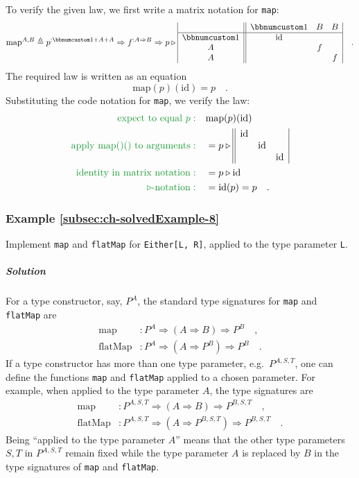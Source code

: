 To verify the given law, we first write a matrix notation for \lstinline!map!:
\[
\text{map}^{A,B}\triangleq p^{:\bbnum 1+A+A}\Rightarrow f^{:A\Rightarrow B}\Rightarrow p\triangleright\begin{array}{|c||ccc|}
 & \bbnum 1 & B & B\\
\hline \bbnum 1 & \text{id} &  & \\
A &  & f & \\
A &  &  & f
\end{array}\quad.
\]
The required law is written as an equation
\[
\text{map}(p)(\text{id})=p\quad.
\]
Substituting the code notation for \lstinline!map!, we verify the
law:
\begin{align*}
{\color{greenunder}\text{expect to equal }p:}\quad & \text{map}(p)(\text{id})\\
{\color{greenunder}\text{apply map()() to arguments}:}\quad & =p\triangleright\begin{array}{||ccc|}
\text{id} &  & \\
 & \text{id} & \\
 &  & \text{id}
\end{array}\\
{\color{greenunder}\text{identity in matrix notation}:}\quad & =p\triangleright\text{id}\\
{\color{greenunder}\triangleright\text{-notation}:}\quad & =\text{id}(p)=p\quad.
\end{align*}


\subsubsection{Example \label{subsec:ch-solvedExample-8}\ref{subsec:ch-solvedExample-8}}

Implement \lstinline!map! and \lstinline!flatMap! for \lstinline!Either[L, R]!,
applied to the type parameter \lstinline!L!.

\subparagraph{Solution}

For a type constructor, say, $P^{A}$, the standard type signatures
for \lstinline!map! and \lstinline!flatMap! are
\begin{align*}
\text{map} & :P^{A}\Rightarrow(A\Rightarrow B)\Rightarrow P^{B}\quad,\\
\text{flatMap} & :P^{A}\Rightarrow(A\Rightarrow P^{B})\Rightarrow P^{B}\quad.
\end{align*}
If a type constructor has more than one type parameter, e.g.~$P^{A,S,T}$,
one can define the functions \lstinline!map! and \lstinline!flatMap!
applied to a chosen parameter. For example, when applied to the type
parameter $A$, the type signatures are 
\begin{align*}
\text{map} & :P^{A,S,T}\Rightarrow(A\Rightarrow B)\Rightarrow P^{B,S,T}\quad,\\
\text{flatMap} & :P^{A,S,T}\Rightarrow(A\Rightarrow P^{B,S,T})\Rightarrow P^{B,S,T}\quad.
\end{align*}
Being ``applied to the type parameter $A$'' means that the other
type parameters $S,T$ in $P^{A,S,T}$ remain fixed while the type
parameter $A$ is replaced by $B$ in the type signatures of \lstinline!map!
and \lstinline!flatMap!.


